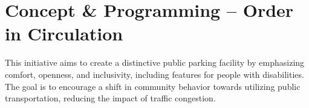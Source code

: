 \section*{
  Concept \& Programming -- Order in Circulation
 }

\vfill
This initiative aims to create a distinctive public parking facility by emphasizing comfort, openness, and inclusivity, including features for people with disabilities. The goal is to encourage a shift in community behavior towards utilizing public transportation, reducing the impact of traffic congestion.
\vfill
\begin{center}
	\begin{minipage}[b]{0.875\linewidth}
		\setlength{\columnsep}{0.5cm}
		\begin{multicols}{2}
			
			
			
			
		\end{multicols}
		\vfill
		
		\vfill
		\setlength{\columnsep}{0.5cm}
		\begin{multicols}{2}
			
			
		\end{multicols}
	\end{minipage}
\end{center}
\EndTwoColumnLayout
\newpage
